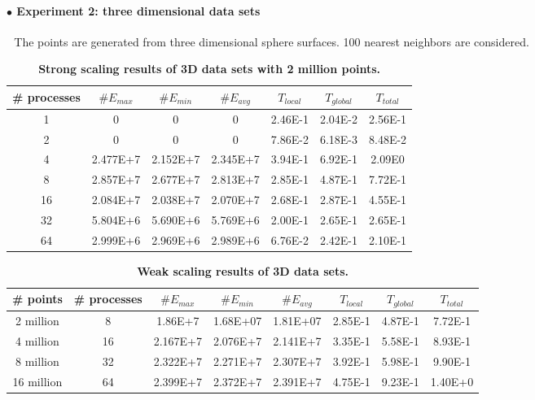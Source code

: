 \documentclass[12pt]{article}
\begin{document}
\paragraph{$\bullet$ Experiment 2: three dimensional data sets}
$ $\newline
$ $\newline
\indent The points are generated from three dimensional sphere surfaces. 100 nearest neighbors are considered.
$ $\newline
\renewcommand{\arraystretch}{1.7}
\begin{table}[h]
\centering
    \caption{\textbf{Strong scaling results of 3D data sets with 2 million points.} }
	\label{2M3D}
\begin{tabular}{ccccccc}
    \hline %
\# processes  &$\# E_{max}$   &$\# E_{min}$ &$\# E_{avg}$  &$T_{local}$  &$T_{global}$  &$T_{total}$\\
\hline\hline
1  &0  &0  &0  &2.46E-1   &2.04E-2   &2.56E-1 \\
2  &0  &0  &0   &7.86E-2 &6.18E-3  &8.48E-2 \\
4   &2.477E+7   &2.152E+7   &2.345E+7  &3.94E-1   &6.92E-1 &2.09E0 \\
8  &2.857E+7   &2.677E+7   &2.813E+7   &2.85E-1   &4.87E-1 &7.72E-1 \\
16 &2.084E+7   &2.038E+7   &2.070E+7   &2.68E-1   &2.87E-1  &4.55E-1 \\
32  &5.804E+6   &5.690E+6   &5.769E+6   &2.00E-1   &2.65E-1 &2.65E-1 \\
64   &2.999E+6   &2.969E+6   &2.989E+6  &6.76E-2   &2.42E-1 &2.10E-1 \\
\hline
    \end{tabular}
\end{table}

\renewcommand{\arraystretch}{1.7}
\begin{table}[h]
\centering
    \caption{\textbf{Weak scaling results of 3D data sets.} }
	\label{3Dweak}
\begin{tabular}{cccccccc}
    \hline %
\# points &\# processes  &$\# E_{max}$   &$\# E_{min}$ &$\# E_{avg}$  &$T_{local}$  &$T_{global}$  &$T_{total}$\\
\hline\hline
2 million &8 &1.86E+7    &1.68E+07    &1.81E+07    &2.85E-1    &4.87E-1    &7.72E-1\\
4 million &16  &2.167E+7   &2.076E+7   &2.141E+7  &3.35E-1   &5.58E-1 &8.93E-1\\
8 million &32  &2.322E+7   &2.271E+7   &2.307E+7  &3.92E-1   &5.98E-1 &9.90E-1 \\
16 million &64  &2.399E+7   &2.372E+7   &2.391E+7  &4.75E-1   &9.23E-1 &1.40E+0\\
\hline
    \end{tabular}
\end{table}
\end{document}
